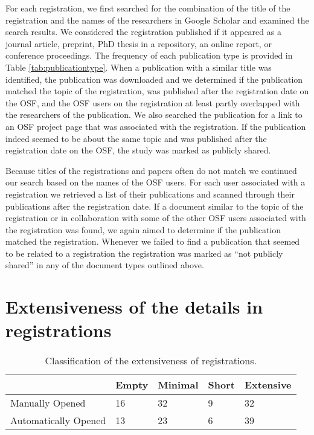 \documentclass[
  ,jou, a4paper,floatsintext]{apa6}
\begin{document}
For each registration, we first searched for the combination of the title of the registration and the names of the researchers in Google Scholar and examined the search results. We considered the registration published if it appeared as a journal article, preprint, PhD thesis in a repository, an online report, or conference proceedings. The frequency of each publication type is provided in Table \ref{tab:publicationtype}. When a publication with a similar title was identified, the publication was downloaded and we determined if the publication matched the topic of the registration, was published after the registration date on the OSF, and the OSF users on the registration at least partly overlapped with the researchers of the publication. We also searched the publication for a link to an OSF project page that was associated with the registration. If the publication indeed seemed to be about the same topic and was published after the registration date on the OSF, the study was marked as publicly shared.

Because titles of the registrations and papers often do not match we continued our search based on the names of the OSF users. For each user associated with a registration we retrieved a list of their publications and scanned through their publications after the registration date. If a document similar to the topic of the registration or in collaboration with some of the other OSF users associated with the registration was found, we again aimed to determine if the publication matched the registration. Whenever we failed to find a publication that seemed to be related to a registration the registration was marked as ``not publicly shared'' in any of the document types outlined above.

\hypertarget{extensiveness-of-the-details-in-registrations}{%
\section{Extensiveness of the details in registrations}\label{extensiveness-of-the-details-in-registrations}}

\begin{table*}[tbp]

\begin{center}
\begin{threeparttable}

\caption{\label{tab:table-quality}Classification of the extensiveness of registrations.}

\begin{tabular}{lllll}
\toprule
 & \multicolumn{1}{c}{Empty} & \multicolumn{1}{c}{Minimal} & \multicolumn{1}{c}{Short} & \multicolumn{1}{c}{Extensive}\\
\midrule
Manually Opened & 16 & 32 & 9 & 32\\
Automatically Opened & 13 & 23 & 6 & 39\\
\bottomrule
\end{tabular}

\end{threeparttable}
\end{center}

\end{table*}
\end{document}
